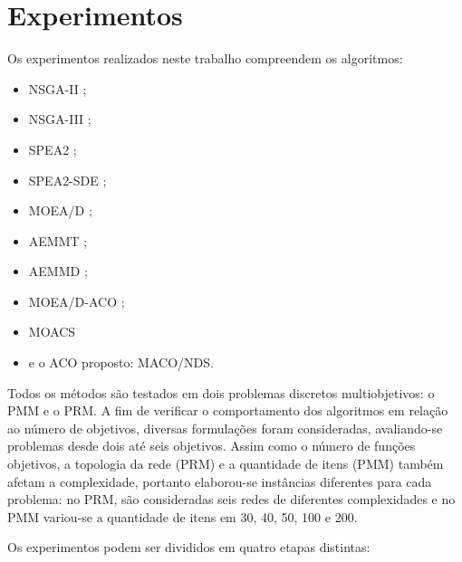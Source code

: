 \chapter[Experimentos]{Experimentos}
\label{chapter_experimentos}

Os experimentos realizados neste trabalho compreendem os algoritmos:

\acresetall
\begin{itemize}
	\item \ac{NSGA-II} \cite{Deb2002};
	\item \ac{NSGA-III} \cite{Deb2014};
	\item \ac{SPEA2} \cite{Zitzler2002};
	\item \ac{SPEA2-SDE} \cite{Spea2SDE};
	\item \ac{MOEA/D} \cite{Zhang2007};
	\item \ac{AEMMT} \cite{Brasil2013};
	\item \ac{AEMMD} \cite{Lafeta2016};
	\item \ac{MOEA/D-ACO} \cite{Ke2013};
	\item \ac{MOACS} \cite{Riveros2016}
	\item e o ACO proposto: \ac{MACO/NDS}.
\end{itemize}

Todos os métodos são testados em dois problemas discretos multiobjetivos: o PMM e o PRM. A fim  de verificar o comportamento dos algoritmos em relação ao número de objetivos, diversas formulações foram consideradas, avaliando-se problemas desde dois até seis objetivos. Assim como o número de funções objetivos, a topologia da rede (PRM) e a quantidade de itens (PMM) também afetam a complexidade, portanto elaborou-se instâncias diferentes para cada problema: no PRM, são consideradas seis redes de diferentes complexidades e no PMM variou-se a quantidade de itens em 30, 40, 50, 100 e 200.

Os experimentos podem ser divididos em quatro etapas distintas:

